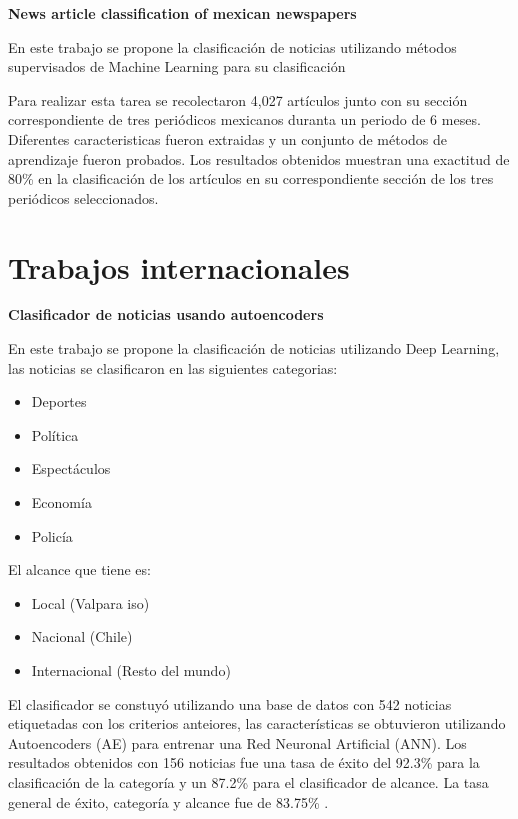 \begin{large}
	 \textbf{News article classification of mexican newspapers}\\
\end{large}

En este trabajo se propone la clasificación de noticias utilizando métodos supervisados de Machine Learning para su clasificación

Para realizar esta tarea se recolectaron 4,027 artículos junto con su sección correspondiente de tres periódicos mexicanos duranta un periodo de 6 meses. Diferentes caracteristicas fueron extraidas y un conjunto de métodos de aprendizaje fueron probados. Los resultados obtenidos muestran una exactitud de 80\% en la clasificación de los artículos en su correspondiente sección de los tres periódicos seleccionados\cite{cinco}.\\



\section[Trabajos i.]{Trabajos internacionales}


\begin{large}
	 \textbf{Clasificador de noticias usando autoencoders}\\
\end{large}

En este trabajo se propone la clasificación de noticias utilizando Deep Learning, las noticias se clasificaron en las siguientes categorias:

\begin{itemize}
	\item Deportes
	\item Política
	\item Espectáculos
	\item Economía
	\item Policía
\end{itemize}
El alcance que tiene es:
\begin{itemize}
	\item Local (Valpara iso)
	\item Nacional (Chile)
	\item Internacional (Resto del mundo)
\end{itemize}
El clasificador se constuyó utilizando una base de datos con 542 noticias etiquetadas con los criterios anteiores, las características se obtuvieron utilizando Autoencoders (AE) para entrenar una Red Neuronal Artificial (ANN).
Los resultados obtenidos con 156 noticias fue una tasa de éxito del 92.3\% para la clasificación de la categoría y un 87.2\% para el clasificador de alcance.
La tasa general de éxito, categoría y alcance fue de 83.75\% \cite{seis}.\\

